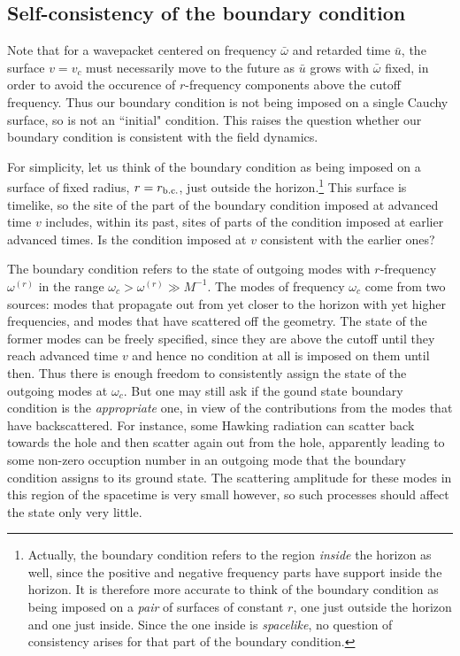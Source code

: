 \documentclass[12pt]{article}
\def\o{\omega}
\def\obar{\bar{\omega}}
\def\ubar{\bar{u}}
\begin{document}
\subsection{Self-consistency of the boundary condition}

Note that for a wavepacket centered
on frequency $\obar$ and retarded time $\ubar$, the surface
$v=v_c$ must necessarily move to the future as $\ubar$ grows
with $\obar$ fixed, in order to avoid the occurence of
$r$-frequency components above the cutoff frequency. Thus
our boundary condition is not being imposed on a single Cauchy
surface, so is not an ``initial" condition. This raises the question
whether our boundary condition is consistent with the field dynamics.

For simplicity, let us think of the boundary condition as being
imposed on a surface of fixed radius, $r=r_{\rm b.c.}$, just outside
the horizon.\footnote{Actually, the boundary condition
refers to the region {\it inside} the horizon as well, since
the positive and negative frequency parts have support inside
the horizon. It is therefore more accurate to think of the
boundary condition as being imposed on a {\it pair} of
surfaces of constant $r$, one just outside the horizon and
one just inside. Since the one inside is {\it spacelike}, no
question of consistency arises for that part of the boundary
condition.}
This surface is timelike, so the site of
the part of the boundary condition imposed at advanced time $v$
includes, within its past, sites of parts of the condition imposed
at earlier advanced times. Is the condition imposed at $v$ consistent
with
the earlier ones?

The boundary condition refers to the
state of outgoing modes with $r$-frequency $\o^{(r)}$ in the range
$\o_c>\o^{(r)}\gg M^{-1}$. The modes of frequency $\o_c$ come from two
sources: modes that propagate out from yet closer to the horizon
with yet higher frequencies, and modes that have scattered off
the geometry.
The state of the former modes can be freely specified, since they are
above the cutoff until they reach advanced time $v$ and hence no
condition at all is imposed on them until then.
Thus there is enough freedom to consistently assign the
state of the outgoing modes at $\o_c$. But one may still ask
if the gound state boundary condition is the {\it
appropriate} one, in view of the contributions from the
modes that have backscattered. For instance, some Hawking
radiation can scatter back towards the
hole and then scatter again out from the hole, apparently leading
to some non-zero occuption number in an outgoing mode that the
boundary condition assigns to its ground state. The scattering
amplitude for these modes in this region of the spacetime is very
small however, so such processes should affect the
state only very little.
\end{document}
